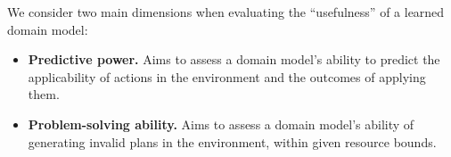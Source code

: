 \documentclass[letterpaper]{article} %
\newif\ifaddcomments
\newcommand{\roni}[1]{\ifaddcomments{\textcolor{red}{[Roni: #1]}}\fi}
\newcommand{\mauro}[1]{\ifaddcomments{\textcolor{green}{[Mauro: #1]}}\fi}
\newcommand{\gregor}[1]{\ifaddcomments{\textcolor{orange}{[Gregor: #1]}}\fi}
\begin{document}
We consider two main dimensions when evaluating the ``usefulness'' of a learned domain model: 
%
\begin{itemize}
    \item \textbf{Predictive power.} Aims to assess a domain model's ability to predict the applicability of actions in the environment and the outcomes of applying them. 
    \item \textbf{Problem-solving ability.} Aims to assess a domain model's ability of generating invalid plans in the environment, within given resource bounds. %
\end{itemize}
\end{document}
